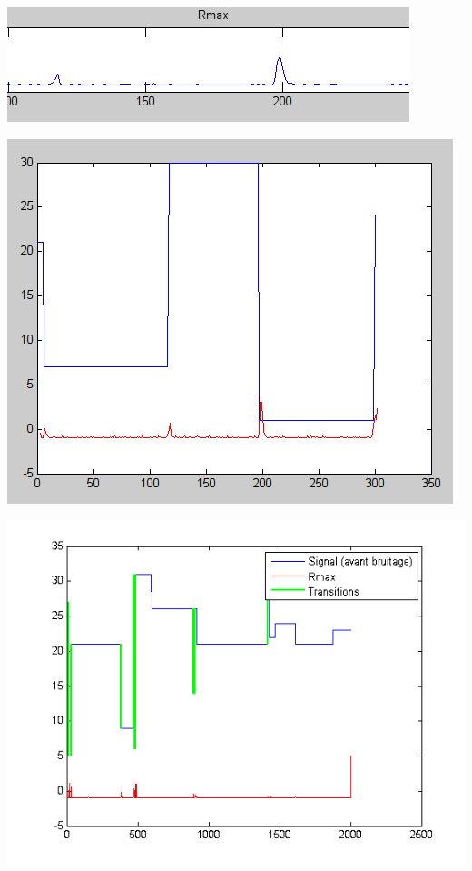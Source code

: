 \documentclass{beamer}
\begin{document}
\begin{frame}
\begin{center}
\includegraphics[scale=0.4]{capture/J.png}
\end{center}
\end{frame}

\begin{frame}
\begin{center}
\includegraphics[scale=0.4]{capture/K.png}
\end{center}
\end{frame}

\begin{frame}
\begin{center}
\includegraphics[scale=0.7]{capture3/partie3_07.png}
\end{center}
\end{frame}
\end{document}
